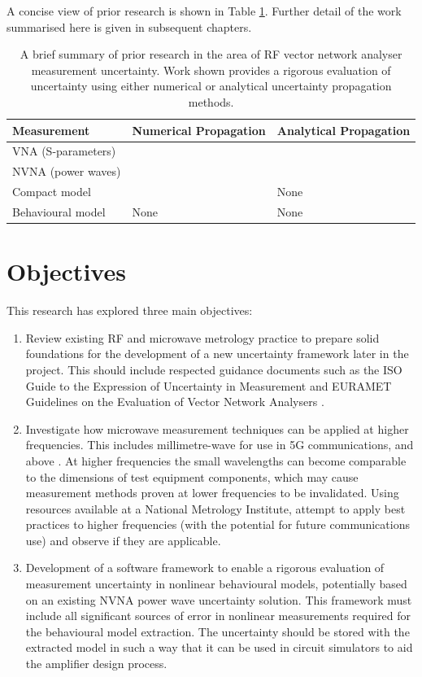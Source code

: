 \documentclass[../thesis/thesis.tex]{subfiles}
\begin{document}
A concise view of prior research is shown in Table \ref{ch1_table_prior}. Further detail of the work summarised here is given in subsequent chapters.

\begin{table}[]
	\begin{tabular}{@{}lll@{}}
		\toprule
		Measurement        & Numerical Propagation & Analytical Propagation\\ \midrule
		VNA (S-parameters) & \cite{Hoffman_2007,VNATools}  & \cite{Lewandowski_2010B,VNATools}           \\
		NVNA (power waves) & \cite{MUFWebsite,Avolio_2015}          & \cite{Lin_2012}           \\
		Compact model      & \cite{Williams_2016,Cheron_2018}    & None           \\
		Behavioural model  & None          &  None          \\ \bottomrule
	\end{tabular}
\caption[Summary of prior research into RF vector network analyser measurement uncertainty.]{A brief summary of prior research in the area of RF vector network analyser measurement uncertainty. Work shown provides a rigorous evaluation of uncertainty using either numerical or analytical uncertainty propagation methods.}
\label{ch1_table_prior}
\end{table}

\newpage
\section{Objectives}
This research has explored three main objectives:
\begin{enumerate}
	\item Review existing RF and microwave metrology practice to prepare solid foundations for the development of a new uncertainty framework later in the project. This should include respected guidance documents such as the ISO Guide to the Expression of Uncertainty in Measurement \cite{GUM_2008} and EURAMET Guidelines on the Evaluation of Vector Network Analysers \cite{EURAMET_2011}.
	\item Investigate how microwave measurement techniques can be applied at higher frequencies. This includes millimetre-wave for use in 5G communications, and above \cite{Dahlman_2014}. At higher frequencies the small wavelengths can become comparable to the dimensions of test equipment components, which may cause measurement methods proven at lower frequencies to be invalidated. Using resources available at a National Metrology Institute, attempt to apply best practices to higher frequencies (with the potential for future communications use) and observe if they are applicable.
	\item Development of a software framework to enable a rigorous evaluation of measurement uncertainty in nonlinear behavioural models, potentially based on an existing NVNA power wave uncertainty solution. This framework must include all significant sources of error in nonlinear measurements required for the behavioural model extraction. The uncertainty should be stored with the extracted model in such a way that it can be used in circuit simulators to aid 
	the amplifier design process.
\end{enumerate}
\end{document}
